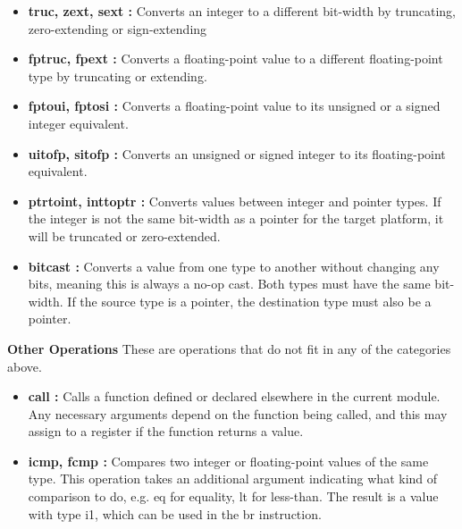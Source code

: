 \documentclass{book}
\begin{document}
	\begin{itemize}
		\item \textbf{truc, zext, sext : }Converts an integer to a different bit-width by truncating, zero-extending or sign-extending
		\item \textbf{fptruc, fpext : } Converts a floating-point value to a different floating-point type by truncating or extending.
		\item \textbf{fptoui, fptosi : }Converts a floating-point value to its unsigned or a signed integer	equivalent.
		\item \textbf{uitofp, sitofp : } Converts  an  unsigned  or  signed  integer  to  its  floating-point equivalent.
		\item \textbf{ptrtoint, inttoptr : }Converts  values  between  integer  and  pointer  types. If the integer is not the same bit-width as a pointer for the target platform, it will be
		truncated or zero-extended.
		\item \textbf{bitcast : }Converts a value from one type to another without changing any bits,
		meaning this is always a no-op cast. Both types must have the same bit-width. If the source type is a pointer, the destination type must also be a pointer.
	\end{itemize}

	\textbf{Other Operations} \newline \newline
	These are operations that do not fit in any of the categories above.
	
	\begin{itemize}
		\item \textbf{call : }Calls a function defined or declared elsewhere in the current module.  Any necessary arguments depend on the function being called, and this may assign to a register if the function returns a value.
		\item \textbf{icmp, fcmp : }Compares two integer or floating-point values of the same type. This operation takes an additional argument indicating what kind of comparison to do, e.g. eq for equality, lt for less-than. The result is a value with type i1, which can be used in the br instruction.
	\end{itemize}
	
\end{document}

